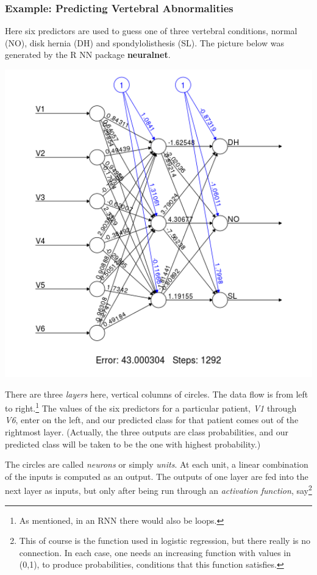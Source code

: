 \subsubsection{Example: Predicting Vertebral Abnormalities}

Here six predictors are used to guess one of three vertebral conditions,
normal (NO), disk hernia (DH) and spondylolisthesis (SL).  The picture
below was generated by the R NN package \textbf{neuralnet}.

\includegraphics[width=5.6in]{Images/VertebraeNN.png} 

There are three \textit{layers} here, vertical columns of circles.  The
data flow is from left to right.\footnote{As mentioned, in an RNN there
would also be loops.}  The values of the six predictors for a particular
patient, \textit{V1} through \textit{V6}, enter on the left, and our
predicted class for that patient comes out of the rightmost layer.
(Actually, the three outputs are class probabilities, and our predicted
class will be taken to be the one with highest probability.)

The circles are called \textit{neurons} or simply \textit{units}.  At
each unit, a linear combination of the inputs is computed as an output.
The outputs of one layer are fed into the next layer as inputs, but only
after being run through an \textit{activation function},
say\footnote{This of course is the function used in logistic regression,
but there really is no connection.  In each case, one needs an
increasing function with values in (0,1), to produce probabilities,
conditions that this function satisfies.}

